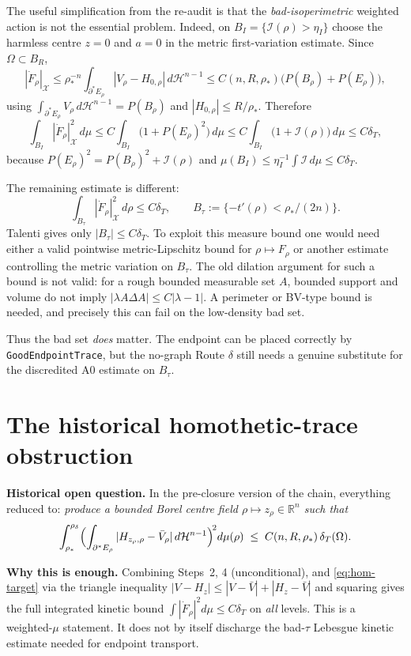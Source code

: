 \documentclass[11pt]{article}
\theoremstyle{definition}
\newcommand{\R}{\mathbb{R}}
\newcommand{\Om}{\Omega}
\newcommand{\X}{\mathcal X}
\newcommand{\rstar}{\rho_{*}}
\newcommand{\rdel}{\rho_\delta}
\newcommand{\Hn}{\mathcal H^{n-1}}
\begin{document}
The useful simplification from the re-audit is that the
\emph{bad-isoperimetric} weighted action is not the essential problem.
Indeed, on $B_I=\{\mathcal I(\rho)>\eta_I\}$ choose the harmless centre
$z=0$ and $a=0$ in the metric first-variation estimate.  Since
$\Om\subset B_R$,
\[
   |\dot F_\rho|_{\X}
   \le \rho_*^{-n}\int_{\partial^*E_\rho}|V_\rho-H_{0,\rho}|\,d\Hn
   \le C(n,R,\rho_*)\bigl(P(B_\rho)+P(E_\rho)\bigr),
\]
using $\int_{\partial^*E_\rho}V_\rho\,d\Hn=P(B_\rho)$ and
$|H_{0,\rho}|\le R/\rho_*$.  Therefore
\[
   \int_{B_I}|\dot F_\rho|_{\X}^{2}\,d\mu
   \le C\int_{B_I}\bigl(1+P(E_\rho)^2\bigr)\,d\mu
   \le C\int_{B_I}\bigl(1+\mathcal I(\rho)\bigr)\,d\mu
   \le C\delta_T,
\]
because $P(E_\rho)^2=P(B_\rho)^2+\mathcal I(\rho)$ and
$\mu(B_I)\le\eta_I^{-1}\int\mathcal I\,d\mu\le C\delta_T$.

The remaining estimate is different:
\[
   \int_{B_{\tau}}|\dot F_\rho|_{\X}^{2}\,d\rho\le C\delta_T,
   \qquad
   B_\tau:=\{-t'(\rho)<\rho_*/(2n)\}.
\]
Talenti gives only $|B_\tau|\le C\delta_T$.  To exploit this measure
bound one would need either a valid pointwise metric-Lipschitz bound
for $\rho\mapsto F_\rho$ or another estimate controlling the metric
variation on $B_\tau$.  The old dilation argument for such a bound is
not valid: for a rough bounded measurable set $A$, bounded support and
volume do not imply
$|\lambda A\Delta A|\le C|\lambda-1|$.  A perimeter or BV-type bound is
needed, and precisely this can fail on the low-density bad set.

Thus the bad set \emph{does} matter.  The endpoint can be placed
correctly by \texttt{GoodEndpointTrace}, but the no-graph Route
$\delta$ still needs a genuine substitute for the discredited A0
estimate on $B_\tau$.

\section{The historical homothetic-trace obstruction}\label{sec:gap}

\textbf{Historical open question.}  In the pre-closure version of the
chain, everything reduced to:
\emph{produce a bounded Borel centre field $\rho\mapsto z_{\rho}\in\R^{n}$ such that}
\begin{equation}\label{eq:hom-target}
   \int_{\rstar}^{\rdel}\Bigl(\int_{\partial^{*}E_{\rho}}|H_{z_{\rho},\rho}-\bar V_{\rho}|\,d\Hn\Bigr)^{\!2}d\mu(\rho)
   \;\le\;C(n,R,\rstar)\,\delta_{T}(\Om).
\end{equation}

\textbf{Why this is enough.}  Combining Steps~2, 4 (unconditional), and
\eqref{eq:hom-target} via the triangle inequality
$|V-H_{z}|\le|V-\bar V|+|H_{z}-\bar V|$ and squaring gives the full
integrated kinetic bound
$\int|\dot F_{\rho}|^{2}d\mu\le C\delta_{T}$ on \emph{all} levels.
This is a weighted-$\mu$ statement.  It does not by itself discharge
the bad-$\tau$ Lebesgue kinetic estimate needed for endpoint
transport.
\end{document}
